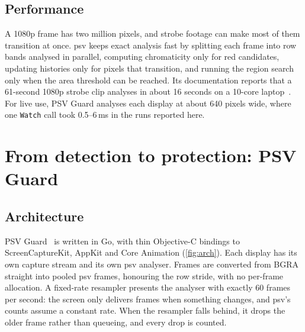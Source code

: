 \documentclass[11pt,a4paper]{article}
\newcommand{\psv}{\textsf{psv}}
\newcommand{\guard}{PSV Guard}
\newcommand{\code}[1]{\texttt{#1}}
\begin{document}
\subsection{Performance}

A 1080p frame has two million pixels, and strobe footage can make most of them transition at once. \psv{} keeps exact analysis fast by splitting each frame into row bands analysed in parallel, computing chromaticity only for red candidates, updating histories only for pixels that transition, and running the region search only when the area threshold can be reached. Its documentation reports that a 61-second 1080p strobe clip analyses in about 16 seconds on a 10-core laptop~\cite{psv}. For live use, \guard{} analyses each display at about 640 pixels wide, where one \code{Watch} call took 0.5--6\,ms in the runs reported here.

\section{From detection to protection: \guard{}}
\label{sec:guard}

\subsection{Architecture}

\guard{}~\cite{psvguard} is written in Go, with thin Objective-C bindings to ScreenCaptureKit, AppKit and Core Animation (\cref{fig:arch}). Each display has its own capture stream and its own \psv{} analyser. Frames are converted from BGRA straight into pooled \psv{} frames, honouring the row stride, with no per-frame allocation. A fixed-rate resampler presents the analyser with exactly 60 frames per second: the screen only delivers frames when something changes, and \psv{}'s counts assume a constant rate. When the resampler falls behind, it drops the older frame rather than queueing, and every drop is counted.
\end{document}

